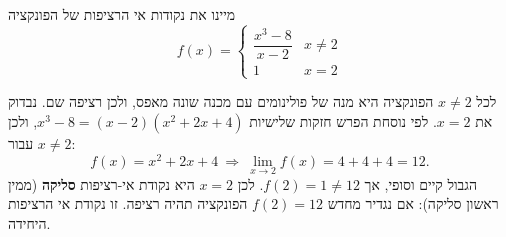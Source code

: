 
\begin{question}
מיינו את נקודות אי הרציפות של הפונקציה
\[ f(x)=\begin{cases}\dfrac{x^3-8}{x-2} & x\neq 2\\[2mm] 1 & x=2\end{cases} \]
\end{question}

\begin{solution}
לכל $x\neq 2$ הפונקציה היא מנה של פולינומים עם מכנה שונה מאפס, ולכן רציפה שם. נבדוק את $x=2$. לפי נוסחת הפרש חזקות שלישיות $x^3-8=(x-2)(x^2+2x+4)$, ולכן עבור $x\neq2$:
\[ f(x)=x^2+2x+4\ \Longrightarrow\ \lim_{x\to2}f(x)=4+4+4=12. \]
הגבול קיים וסופי, אך $f(2)=1\neq 12$. לכן $x=2$ היא נקודת אי-רציפות \textbf{סליקה} (ממין ראשון סליקה): אם נגדיר מחדש $f(2)=12$ הפונקציה תהיה רציפה. זו נקודת אי הרציפות היחידה.
\end{solution}
